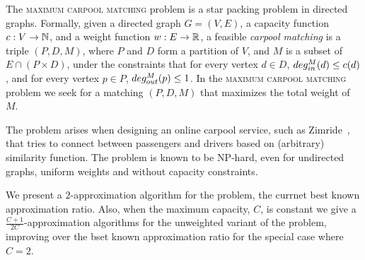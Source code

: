 The \textsc{maximum carpool matching} problem is a star packing problem in
directed graphs.
Formally, given a directed graph $G = (V, E)$,
a capacity function $ c: V \rightarrow \mathbb{N} $,
and a weight function $w : E \rightarrow \mathbb{R} $,
a feasible \emph{carpool matching} is a triple 
$(P, D, M)$, where $P$ and $D$ form a partition of $V$, 
and $M$ is a subset of $E \cap (P \times D)$,
under the constraints that for every vertex $d \in D$, 
$deg^M_{in}(d) \leq c(d)$, 
and for every vertex $p \in P$, $deg^M_{out}(p) \leq 1$.
In the \textsc{maximum carpool matching} 
problem we seek for a matching $(P, D, M)$ that maximizes the total weight of $M$.

The problem arises when designing an online carpool service, 
such as Zimride~\cite{zimride}, 
that tries to connect between passengers and drivers based on (arbitrary) similarity function.
The problem is known to be NP-hard, 
even for undirected graphs, uniform weights and without capacity constraints.

We present a $2$-approximation algorithm for the problem,
the currnet best known approximation ratio.
Also, when the maximum capacity, $C$, is constant we give a
$\frac{C + 1}{2C}$-approximation algorithms for the 
unweighted variant of the problem, 
improving over the bset known approximation ratio for the special case where $C = 2$.
